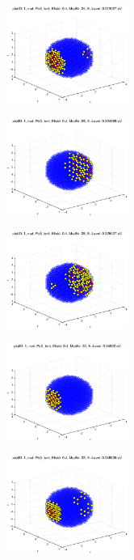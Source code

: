 \begin{figure}
	\centering
	\begin{subfigure}{150px}
		\includegraphics[width=150px]{Fig/Plots/r25v04Mod24}
		\caption{}
	\end{subfigure}
	\begin{subfigure}{150px}
		\includegraphics[width=150px]{Fig/Plots/r25v04Mod26}
		\caption{}
	\end{subfigure}
	\begin{subfigure}{150px}
		\includegraphics[width=150px]{Fig/Plots/r25v04Mod28}
		\caption{}
	\end{subfigure}
	\begin{subfigure}{150px}
		\includegraphics[width=150px]{Fig/Plots/r25v04Mod30}
		\caption{}
	\end{subfigure}
	\begin{subfigure}{150px}
		\includegraphics[width=150px]{Fig/Plots/r25v04Mod32}

\end{subfigure}
\end{figure}
